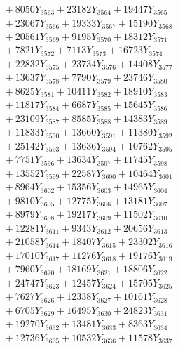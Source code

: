 \documentclass[a4paper,10pt]{article}
\begin{document}
{\begin{align}
&\;  + 8050 Y_{3563} + 23182 Y_{3564} + 19447 Y_{3565} \\[0.3ex]
&\;  + 23067 Y_{3566} + 19333 Y_{3567} + 15190 Y_{3568} \\[0.5ex]\allowbreak
&\;  + 20561 Y_{3569} + 9195 Y_{3570} + 18312 Y_{3571} \\[0.3ex]
&\;  + 7821 Y_{3572} + 7113 Y_{3573} + 16723 Y_{3574} \\[0.3ex]
&\;  + 22832 Y_{3575} + 23734 Y_{3576} + 14408 Y_{3577} \\[0.3ex]
&\;  + 13637 Y_{3578} + 7790 Y_{3579} + 23746 Y_{3580} \\[0.3ex]
&\;  + 8625 Y_{3581} + 10411 Y_{3582} + 18910 Y_{3583} \\[0.3ex]
&\;  + 11817 Y_{3584} + 6687 Y_{3585} + 15645 Y_{3586} \\[0.3ex]
&\;  + 23109 Y_{3587} + 8585 Y_{3588} + 14383 Y_{3589} \\[0.3ex]
&\;  + 11833 Y_{3590} + 13660 Y_{3591} + 11380 Y_{3592} \\[0.3ex]
&\;  + 25142 Y_{3593} + 13636 Y_{3594} + 10762 Y_{3595} \\[0.3ex]
&\;  + 7751 Y_{3596} + 13634 Y_{3597} + 11745 Y_{3598} \\[0.5ex]\allowbreak
&\;  + 13552 Y_{3599} + 22587 Y_{3600} + 10464 Y_{3601} \\[0.3ex]
&\;  + 8964 Y_{3602} + 15356 Y_{3603} + 14965 Y_{3604} \\[0.3ex]
&\;  + 9810 Y_{3605} + 12775 Y_{3606} + 13181 Y_{3607} \\[0.3ex]
&\;  + 8979 Y_{3608} + 19217 Y_{3609} + 11502 Y_{3610} \\[0.3ex]
&\;  + 12281 Y_{3611} + 9343 Y_{3612} + 20656 Y_{3613} \\[0.3ex]
&\;  + 21058 Y_{3614} + 18407 Y_{3615} + 23302 Y_{3616} \\[0.3ex]
&\;  + 17010 Y_{3617} + 11276 Y_{3618} + 19176 Y_{3619} \\[0.3ex]
&\;  + 7960 Y_{3620} + 18169 Y_{3621} + 18806 Y_{3622} \\[0.3ex]
&\;  + 24747 Y_{3623} + 12457 Y_{3624} + 15705 Y_{3625} \\[0.3ex]
&\;  + 7627 Y_{3626} + 12338 Y_{3627} + 10161 Y_{3628} \\[0.5ex]\allowbreak
&\;  + 6705 Y_{3629} + 16495 Y_{3630} + 24823 Y_{3631} \\[0.3ex]
&\;  + 19270 Y_{3632} + 13481 Y_{3633} + 8363 Y_{3634} \\[0.3ex]
&\;  + 12736 Y_{3635} + 10532 Y_{3636} + 11578 Y_{3637} \\[0.3ex]

\end{align}}
\end{document}
